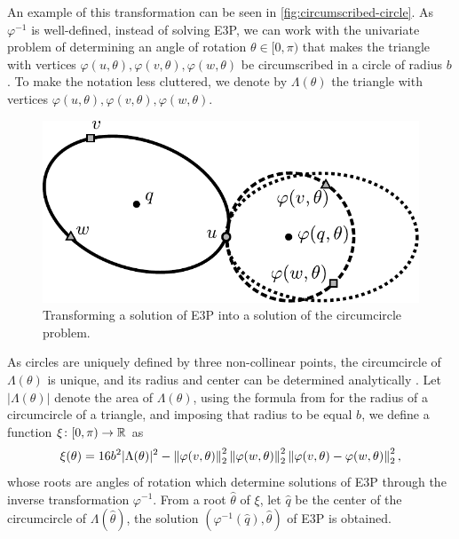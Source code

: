 An example of this transformation can be seen in \autoref{fig:circumscribed-circle}. As $\varphi^{-1}$ is well-defined, instead of solving E3P, we can work with the univariate problem of determining an angle of rotation $\theta \in [0, \pi)$ that makes the triangle with vertices $\varphi(u, \theta), \varphi(v, \theta), \varphi(w, \theta)$ be circumscribed in a circle of radius $b$. To make the notation less cluttered, we denote by $\Lambda(\theta)$ the triangle with vertices $\varphi(u, \theta), \varphi(v, \theta), \varphi(w, \theta)$.

\begin{figure}[!htb]
	\centering
	
	\includegraphics[scale=.8]{figures/circumscribed-circle}
	\caption{Transforming a solution of E3P into a solution of the circumcircle problem.}
	\label{fig:circumscribed-circle}
\end{figure}

As circles are uniquely defined by three non-collinear points, the circumcircle of $\Lambda(\theta)$ is unique, and its radius and center can be determined analytically \cite{weisstein}.
Let $|\Lambda(\theta)|$ denote the area of $\Lambda(\theta)$, using the formula from \cite[p.~189]{johnson1960} for the radius of a circumcircle of a triangle, and imposing that radius to be equal $b$, we define a function $\xi \colon [0, \pi) \to \mathbb{R}$ as
\begin{equation}\label{eq:circumscribed_circle_b}
\xi(\theta) = 16b^2|\Lambda(\theta)|^2 - \left\lVert\varphi(v, \theta)\right\rVert_{2}^2\left\lVert\varphi(w, \theta)\right\rVert_{2}^2\left\lVert\varphi(v, \theta)-\varphi(w, \theta)\right\rVert_{2}^2,
\end{equation}
whose roots are angles of rotation which determine solutions of E3P through the inverse transformation $\varphi^{-1}$.
From a root $\hat{\theta}$ of $\xi$, let $\hat{q}$ be the center of the circumcircle of $\Lambda(\hat{\theta})$, the solution $(\varphi^{-1}(\hat{q}), \hat{\theta})$ of E3P is obtained. 

